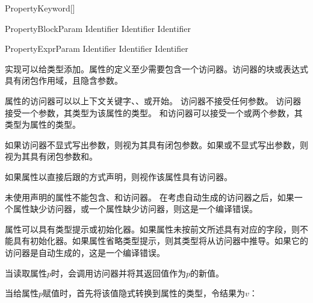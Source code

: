 \begin{bnf}{PropertyKeyword}[\oneof]
\end{bnf}

\begin{bnf}{PropertyBlockParam}
    Identifier \br
    Identifier \terminal{,} Identifier
\end{bnf}

\begin{bnf}{PropertyExprParam}
    Identifier \br
    \terminal{(} Identifier \terminal{,} Identifier \terminal{)}
\end{bnf}

\pnum
实现可以给类型添加。属性的定义至少需要包含一个访问器。访问器的块或表达式具有闭包作用域，且隐含参数。

\pnum
属性的访问器可以以上下文关键字、、或开始。
访问器不接受任何参数。
访问器接受一个参数，其类型为该属性的类型。
和访问器可以接受一个或两个参数，其类型为属性的类型。

\pnum
如果访问器不显式写出参数，则视为其具有闭包参数。如果或不显式写出参数，则视为其具有闭包参数和。

\pnum
如果属性以直接后跟的方式声明，则视作该属性具有访问器。

\pnum
未使用声明的属性不能包含、和访问器。
在考虑自动生成的访问器之后，如果一个属性缺少访问器，或一个属性缺少访问器，则这是一个编译错误。

\pnum
属性可以具有类型提示或初始化器。如果属性未按前文所述具有对应的字段，则不能具有初始化器。如果属性省略类型提示，则其类型将从访问器中推导。如果它的访问器是自动生成的，这是一个编译错误。

\pnum
当读取属性$p$时，会调用访问器并将其返回值作为$p$的新值。

\pnum
当给属性$p$赋值时，首先将该值隐式转换到属性的类型，令结果为$v$：

